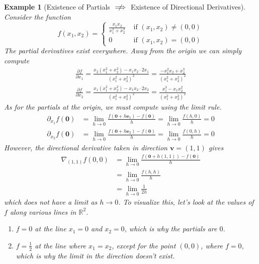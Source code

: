 \documentclass{article}
\newtheorem{example}{Example}[section]
\theoremstyle{remark}
\theoremstyle{definition}
\begin{document}
\begin{example}[Existence of Partials $\centernot \implies$ Existence of Directional Derivatives]
Consider the function 
\[f(x_1, x_2) = \begin{cases} 
\frac{x_1 x_2}{x_1^2 + x_2^2} & \text{ if } (x_1, x_2) \neq (0, 0) \\
0 & \text{ if } (x_1, x_2) = (0, 0) 
\end{cases}\]
The partial derivatives exist everywhere. Away from the origin we can simply compute 
\begin{align*}
    \frac{\partial f}{\partial x_1} = \frac{x_2 (x_1^2 + x_2^2) - x_1 x_2 \cdot 2x_1}{(x_1^2 + x_2^2)^2} = \frac{- x_1^2 x_2 + x_2^3}{(x_1^2 + x_2^2)^2} \\
    \frac{\partial f}{\partial x_2} = \frac{x_1 (x_1^2 + x_2^2) - x_1 x_2 \cdot 2 x_2}{(x_1^2 + x_2^2)^2} = \frac{x_1^3 - x_1 x_2^2}{(x_1^2 + x_2^2)^2}
\end{align*}
As for the partials at the origin, we must compute using the limit rule. 
\begin{align*}
    \partial_{x_1} f (\mathbf{0}) & = \lim_{h \rightarrow 0} \frac{f(\mathbf{0} + h \mathbf{e}_1) - f(\mathbf{0})}{h} = \lim_{h \rightarrow 0} \frac{f(h, 0)}{h} = 0  \\
    \partial_{x_2} f (\mathbf{0}) & = \lim_{h \rightarrow 0} \frac{f(\mathbf{0} + h \mathbf{e}_2) - f(\mathbf{0})}{h} = \lim_{h \rightarrow 0} \frac{f(0, h)}{h} = 0
\end{align*}
However, the directional derivative taken in direction $\mathbf{v} = (1, 1)$ gives 
\begin{align*}
    \nabla_{(1, 1)} f (0, 0) & = \lim_{h \rightarrow 0} \frac{f(\mathbf{0} + h (1, 1)) - f(\mathbf{0})}{h} \\
    & = \lim_{h \rightarrow 0} \frac{f(h, h)}{h} \\
    & = \lim_{h \rightarrow 0} \frac{1}{2h} 
\end{align*}
which does not have a limit as $h \rightarrow 0$. To visualize this, let's look at the values of $f$ along various lines in $\mathbb{R}^2$. 
\begin{enumerate}
    \item $f = 0$ at the line $x_1 = 0$ and $x_2 = 0$, which is why the partials are $0$. 
    \item $f = \frac{1}{2}$ at the line where $x_1 = x_2$, except for the point $(0, 0)$, where $f = 0$, which is why the limit in the direction doesn't exist. 
\end{enumerate}
\end{example}
\end{document}
